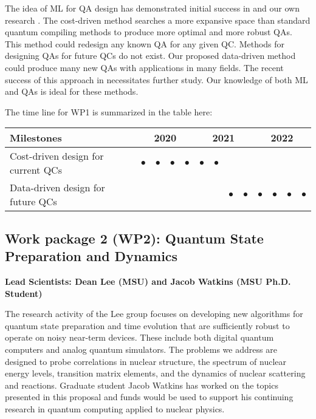 \documentclass[10pt]{article}
\begin{document}
The idea of ML for QA design has demonstrated initial success in \cite{Mitarai2018,Cincio2018} and our own research \cite{Khatri2018}. The cost-driven method searches a more expansive space than standard quantum compiling methods to produce more optimal and more robust QAs. This method could redesign any known QA for any given QC.
Methods for designing QAs for future QCs do not exist. Our proposed data-driven method could produce many new QAs with applications in many fields. The recent success of this approach in \cite{Cincio2018} necessitates further study. Our knowledge of both ML and QAs is ideal for these methods.


The time line for WP1 is summarized in the table here:
\begin{footnotesize}
\begin{center}
\begin{tabular}{|l|c|c|c|c|c|c|c|c|c|c|c|c|}
\hline
\multicolumn{1}{|l}{Milestones } & \multicolumn{4}{|c|}{ 2020 } & \multicolumn{4}{c|}{ 2021 } & \multicolumn{4}{c|}{ 2022 } \\
\hline
Cost-driven design for current QCs &$\bullet$ &$\bullet$ &$\bullet$ &$\bullet$ & $\bullet$ & $\bullet$& & & & & & \\
\hline
Data-driven design for future QCs & & & & & & & $\bullet$ & $\bullet$ & $\bullet$ &$\bullet$ &$\bullet$ &$\bullet$ \\
\hline
\end{tabular}
\end{center}
\end{footnotesize}



\subsection{Work package 2 (WP2): Quantum State Preparation and Dynamics}
{\bf Lead Scientists: Dean Lee (MSU) and Jacob Watkins (MSU Ph.D. Student)}

The research activity of the Lee group focuses on developing new algorithms for quantum state preparation and time evolution that are sufficiently robust to operate on noisy near-term devices.  These include both digital quantum computers and analog quantum simulators.  The problems we address are designed to probe correlations in nuclear structure, the spectrum of nuclear energy levels, transition matrix elements, and the dynamics of nuclear scattering and reactions.  Graduate  student Jacob Watkins has worked on the topics presented in this proposal and funds would be used to support his continuing research in quantum computing applied to nuclear physics. 
\end{document}
